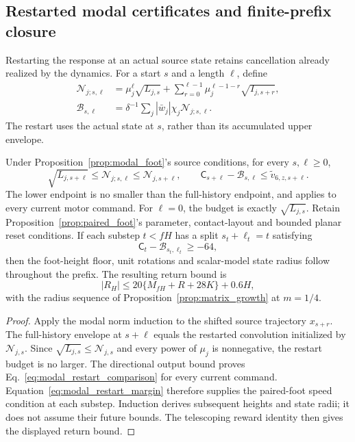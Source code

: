 \subsection{Restarted modal certificates and finite-prefix closure}
\label{app:modal_restart}

Restarting the response at an actual source state retains cancellation already realized by the dynamics.
For a start $s$ and a length $\ell$, define
\begin{align}
 \mathcal N_{j;s,\ell}&=\mu_j^\ell\sqrt{L_{j,s}}+
   \sum_{r=0}^{\ell-1}\mu_j^{\ell-1-r}\sqrt{I_{j,s+r}},\nonumber\\
 \mathcal B_{s,\ell}&=\delta^{-1}\sum_j|\bar w_j|\chi_j\mathcal N_{j;s,\ell}.
 \label{eq:modal_restart_budget}
\end{align}
The restart uses the actual state at $s$, rather than its accumulated upper envelope.

\begin{proposition}
\label{prop:modal_restart}
Under Proposition~\ref{prop:modal_foot}'s source conditions, for every $s,\ell\ge0$,
\begin{equation}
 \sqrt{L_{j,s+\ell}}\le\mathcal N_{j;s,\ell}\le\mathcal N_{j,s+\ell},
 \qquad
 \mathsf C_{s+\ell}-\mathcal B_{s,\ell}\le\widetilde v_{6,z,s+\ell}.
 \label{eq:modal_restart_comparison}
\end{equation}
The lower endpoint is no smaller than the full-history endpoint, and applies to every current motor command.
For $\ell=0$, the budget is exactly $\sqrt{L_{j,s}}$.
Retain Proposition~\ref{prop:paired_foot}'s parameter, contact-layout and bounded planar reset conditions.
If each substep $t<fH$ has a split $s_t+\ell_t=t$ satisfying
\begin{equation}
 \mathsf C_t-\mathcal B_{s_t,\ell_t}\ge-64,
 \label{eq:modal_restart_margin}
\end{equation}
then the foot-height floor, unit rotations and scalar-model state radius follow throughout the prefix.
The resulting return bound is
\begin{equation}
 |R_H|\le20\{M_{fH}+R+28K\}+0.6H,
\end{equation}
with the radius sequence of Proposition~\ref{prop:matrix_growth} at $m=1/4$.
\end{proposition}

\begin{proof}
Apply the modal norm induction to the shifted source trajectory $x_{s+r}$.
The full-history envelope at $s+\ell$ equals the restarted convolution initialized by $\mathcal N_{j,s}$.
Since $\sqrt{L_{j,s}}\le\mathcal N_{j,s}$ and every power of $\mu_j$ is nonnegative, the restart budget is no larger.
The directional output bound proves Eq.~\eqref{eq:modal_restart_comparison} for every current command.
Equation~\eqref{eq:modal_restart_margin} therefore supplies the paired-foot speed condition at each substep.
Induction derives subsequent heights and state radii; it does not assume their future bounds.
The telescoping reward identity then gives the displayed return bound.
\end{proof}

